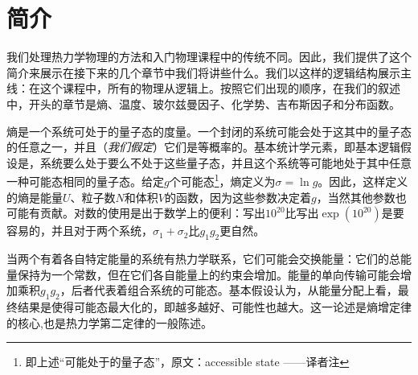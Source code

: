 \chapter*{简介}
 

我们处理热力学物理的方法和入门物理课程中的传统不同。因此，我们提供了这个简介来展示在接下来的几个章节中我们将讲些什么。我们以这样的逻辑结构展示主线：在这个课程中，所有的物理从逻辑上。按照它们出现的顺序，在我们的叙述中，开头的章节是熵、温度、玻尔兹曼因子、化学势、吉布斯因子和分布函数。

熵是一个系统可处于的量子态的度量。一个封闭的系统可能会处于这其中的量子态的任意之一，并且（{\itshape 我们假定}）它们是等概率的。基本统计学元素，即基本逻辑假设是，系统要么处于要么不处于这些量子态，并且这个系统等可能地处于其中任意一种可能态相同的量子态。给定$g$个可能态\footnote{即上述“可能处于的量子态”，原文：accessible state ——译者注}，熵定义为$\sigma=\ln g$。因此，这样定义的熵是能量$U$、粒子数$N$和体积$V$的函数，因为这些参数决定着$g$，当然其他参数也可能有贡献。对数的使用是出于数学上的便利：写出$10^{20}$比写出$\exp({10^{20}})$是要容易的，并且对于两个系统，$\sigma_1+\sigma_2$比$g_1g_2$更自然。

当两个有着各自特定能量的系统有热力学联系，它们可能会交换能量：它们的总能量保持为一个常数，但在它们各自能量上的约束会增加。能量的单向传输可能会增加乘积$g_1g_2$，后者代表着组合系统的可能态。基本假设认为，从能量分配上看，最终结果是使得可能态最大化的，即越多越好、可能性也越大。这一论述是熵增定律的核心,也是热力学第二定律的一般陈述。

